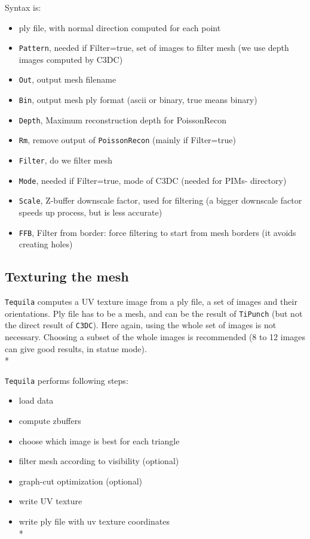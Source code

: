 Syntax is:

\begin{itemize}
  \item ply file, with normal direction computed for each point
  \item {\tt Pattern}, needed if Filter=true, set of images to filter mesh (we use depth images computed by C3DC)
  \item {\tt Out}, output mesh filename
  \item {\tt Bin}, output mesh ply format (ascii or binary, true means binary)
  \item {\tt Depth}, Maximum reconstruction depth for PoissonRecon
  \item {\tt Rm}, remove output of {\tt PoissonRecon} (mainly if Filter=true)
  \item {\tt Filter}, do we filter mesh
  \item {\tt Mode}, needed if Filter=true, mode of C3DC (needed for PIMs- directory)
  \item {\tt Scale}, Z-buffer downscale factor, used for filtering (a bigger downscale factor speeds up process, but is less accurate)
  \item {\tt FFB}, Filter from border: force filtering to start from mesh borders (it avoids creating holes)
\end{itemize}

\subsection{Texturing the mesh}

{\tt Tequila} computes a UV texture image from a ply file, a set of images and their orientations. Ply file has to be a mesh, and can be the result of {\tt TiPunch} (but not the direct result of {\tt C3DC}).
Here again, using the whole set of images is not necessary. Choosing a subset of the whole images is recommended (8 to 12 images can give good results, in statue mode).\\*

{\tt Tequila} performs following steps:

\begin{itemize}
    \item load data
    \item compute zbuffers
    \item choose which image is best for each triangle
    \item filter mesh according to visibility (optional)
    \item graph-cut optimization (optional)
    \item write UV texture
    \item write ply file with uv texture coordinates\\*
\end{itemize}

